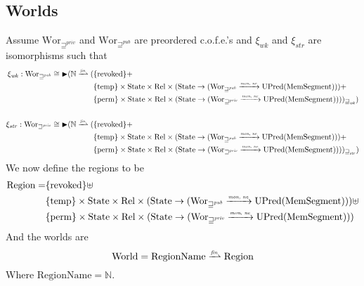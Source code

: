 \documentclass[a4paper]{article}
\newcommand{\finparfun}{\xrightharpoonup{\textit{\tiny{fin}}}}
\newcommand{\monnefun}{\xrightarrow{\textit{\tiny{mon, ne}}}}
\newcommand{\fun}{\rightarrow}
\newcommand{\blater}{\mathop{\blacktriangleright}}
\newcommand{\cofe}{c.o.f.e.}
\newcommand{\cofes}{\cofe{}'s}
\newcommand{\var}[1]{\mathit{#1}}
\newcommand{\future}{\mathbin{\sqsupseteq}}
\newcommand{\futurewk}{\mathbin{\sqsupseteq}^{\var{pub}}}
\newcommand{\futurestr}{\mathbin{\sqsupseteq}^{\var{priv}}}
\newcommand{\plaindom}[1]{\mathrm{#1}}
\newcommand{\HeapSegments}{\plaindom{MemSegment}}
\newcommand{\nats}{\mathbb{N}}
\newcommand{\Rel}{\plaindom{Rel}}
\newcommand{\States}{\plaindom{State}}
\newcommand{\RegionNames}{\plaindom{RegionName}}
\newcommand{\Regions}{\plaindom{Region}}
\newcommand{\Worlds}{\plaindom{World}}
\newcommand{\Wor}{\plaindom{Wor}}
\newcommand{\Worwk}{\Wor_{\futurewk}}
\newcommand{\Worstr}{\Wor_{\futurestr}}
\newcommand{\UPred}[1]{\plaindom{UPred}(#1)}
\newcommand{\plainview}[1]{\mathrm{#1}}
\newcommand{\perma}{\plainview{perm}}
\newcommand{\temp}{\plainview{temp}}
\newcommand{\revoked}{\plainview{revoked}}
\begin{document}
\subsection{Worlds}
Assume $\Worstr$ and $\Worwk$ are preordered \cofes{} and $\xi_{\var{wk}}$ and $\xi_{\var{str}}$ are isomorphisms such that
\begin{align*}
  \xi_{\var{wk}} :   \Worwk \cong \blater (\nats \finparfun (   & \{\revoked\} + \\
                                                                & \{\temp\} \times \States \times \Rel \times (\States \fun (\Worwk \monnefun \UPred{\HeapSegments})) + \\
                                                                & \{\perma\} \times \States \times \Rel \times (\States \fun (\Worstr \monnefun \UPred{\HeapSegments})))_{\future_{\var{wk}}}) \\ \\
  \xi_{\var{str}} :   \Worstr \cong \blater (\nats \finparfun ( & \{\revoked\} + \\
                                                                & \{\temp\} \times \States \times \Rel \times (\States \fun (\Worwk \monnefun \UPred{\HeapSegments})) + \\
                                                                & \{\perma\} \times \States \times \Rel \times (\States \fun (\Worstr \monnefun \UPred{\HeapSegments})))_{\future_{\var{str}}})
\end{align*}
We now define the regions to be
\begin{align*}
  \Regions = & \{\revoked\} \uplus \\
             & \{\temp\} \times \States \times \Rel \times (\States \fun (\Worwk \monnefun \UPred{\HeapSegments})) \uplus \\
             & \{\perma\} \times \States \times \Rel \times (\States \fun (\Worstr \monnefun \UPred{\HeapSegments}))
\end{align*}
And the worlds are
\[
  \Worlds = \RegionNames \finparfun \Regions
\]
Where $\RegionNames = \nats$.
\end{document}

